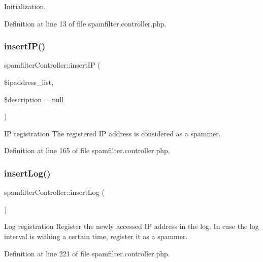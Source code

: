 Initialization. 



Definition at line 13 of file spamfilter.\+controller.\+php.

\mbox{\label{classspamfilterController_aab95351e0ebeffec58d24354aa92e3f5}} 
\subsubsection{\texorpdfstring{insert\+I\+P()}{insertIP()}}
{\footnotesize\ttfamily spamfilter\+Controller\+::insert\+IP (\begin{DoxyParamCaption}\item[{}]{\$ipaddress\+\_\+list,  }\item[{}]{\$description = {\ttfamily null} }\end{DoxyParamCaption})}



IP registration The registered IP address is considered as a spammer. 



Definition at line 165 of file spamfilter.\+controller.\+php.

\mbox{\label{classspamfilterController_a14e2968cb7b9688a6b59b4f02a54a743}} 
\subsubsection{\texorpdfstring{insert\+Log()}{insertLog()}}
{\footnotesize\ttfamily spamfilter\+Controller\+::insert\+Log (\begin{DoxyParamCaption}{ }\end{DoxyParamCaption})}



Log registration Register the newly accessed IP address in the log. In case the log interval is withing a certain time, register it as a spammer. 



Definition at line 221 of file spamfilter.\+controller.\+php.

\mbox{\label{classspamfilterController_a31282e59e182dca5e3f94e4c9122578d}} 
